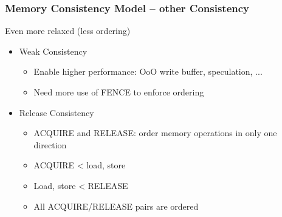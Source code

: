 \begin{frame}[plain]	
    \frametitle{Memory Consistency Model --  other Consistency}
       Even more relaxed (less ordering)
    \begin{itemize}
        \item  Weak Consistency
        
        \begin{itemize}
            \item Enable higher performance: OoO write buffer, speculation, ...
            \item Need more use of FENCE to enforce ordering
        \end{itemize}   
            
            \item Release Consistency
            \begin{itemize}
            \item ACQUIRE and RELEASE: order memory operations in only one direction
            
            \item ACQUIRE < load, store
            \item Load, store < RELEASE
            \item All ACQUIRE/RELEASE pairs are ordered
       
            \end{itemize}
    \end{itemize}
    
\end{frame}




